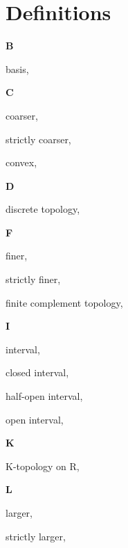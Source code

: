 \section*{Definitions}

\begin{multicols}{2}

\vspace{1em}\large{\textbf{B}}

basis, \pageref{def:Basis}

\vspace{1em}\large{\textbf{C}}

coarser, \pageref{def:Comparable}

\hspace{2em}strictly coarser, \pageref{def:Comparable}

convex, \pageref{def:Convex}

\vspace{1em}\large{\textbf{D}}

discrete topology, \pageref{def:DiscreteTopology}

\vspace{1em}\large{\textbf{F}}

finer, \pageref{def:Comparable}

\hspace{2em}strictly finer, \pageref{def:Comparable}

finite complement topology, \pageref{def:FiniteComplementTopology}

\vspace{1em}\large{\textbf{I}}

interval, \pageref{def:Interval}

\hspace{2em}closed interval, \pageref{def:Interval}

\hspace{2em}half-open interval, \pageref{def:Interval}

\hspace{2em}open interval, \pageref{def:Interval}

\vspace{1em}\large{\textbf{K}}

K-topology on R, \pageref{def:KTopologyOnTheRealLine}

\vspace{1em}\large{\textbf{L}}

larger, \pageref{def:Comparable}

\hspace{2em}strictly larger, \pageref{def:Comparable}


\end{multicols}
